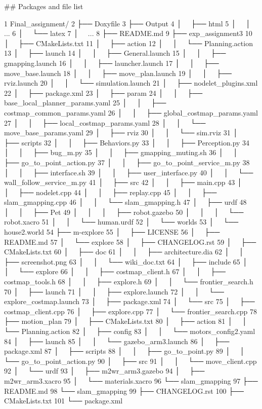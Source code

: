 \#\# Packages and file list 
\begin{DoxyCode}
1 Final\_assignment/
2 ├── Doxyfile
3 ├── Output
4 │   ├── html
5 │   │   ...
6 │   └── latex
7 │       ...
8 ├── README.md
9 ├── exp\_assignment3
10 │   ├── CMakeLists.txt
11 │   ├── action
12 │   │   └── Planning.action
13 │   ├── launch
14 │   │   ├── General.launch
15 │   │   ├── gmapping.launch
16 │   │   ├── launcher.launch
17 │   │   ├── move\_base.launch
18 │   │   ├── move\_plan.launch
19 │   │   ├── rviz.launch
20 │   │   └── simulation.launch
21 │   ├── nodelet\_plugins.xml
22 │   ├── package.xml
23 │   ├── param
24 │   │   ├── base\_local\_planner\_params.yaml
25 │   │   ├── costmap\_common\_params.yaml
26 │   │   ├── global\_costmap\_params.yaml
27 │   │   ├── local\_costmap\_params.yaml
28 │   │   └── move\_base\_params.yaml
29 │   ├── rviz
30 │   │   └── sim.rviz
31 │   ├── scripts
32 │   │   ├── Behaviors.py
33 │   │   ├── Perception.py
34 │   │   ├── bug\_m.py
35 │   │   ├── gmapping\_muting.sh
36 │   │   ├── go\_to\_point\_action.py
37 │   │   ├── go\_to\_point\_service\_m.py
38 │   │   ├── interface.sh
39 │   │   ├── user\_interface.py
40 │   │   └── wall\_follow\_service\_m.py
41 │   ├── src
42 │   │   ├── main.cpp
43 │   │   ├── nodelet.cpp
44 │   │   ├── replay.cpp
45 │   │   ├── slam\_gmapping.cpp
46 │   │   └── slam\_gmapping.h
47 │   ├── urdf
48 │   │   ├── Pet
49 │   │   │   ├── robot.gazebo
50 │   │   │   └── robot.xacro
51 │   │   └── human.urdf
52 │   └── worlds
53 │       └── house2.world
54 ├── m-explore
55 │   ├── LICENSE
56 │   ├── README.md
57 │   └── explore
58 │       ├── CHANGELOG.rst
59 │       ├── CMakeLists.txt
60 │       ├── doc
61 │       │   ├── architecture.dia
62 │       │   ├── screenshot.png
63 │       │   └── wiki\_doc.txt
64 │       ├── include
65 │       │   └── explore
66 │       │       ├── costmap\_client.h
67 │       │       ├── costmap\_tools.h
68 │       │       ├── explore.h
69 │       │       └── frontier\_search.h
70 │       ├── launch
71 │       │   ├── explore.launch
72 │       │   └── explore\_costmap.launch
73 │       ├── package.xml
74 │       └── src
75 │           ├── costmap\_client.cpp
76 │           ├── explore.cpp
77 │           └── frontier\_search.cpp
78 ├── motion\_plan
79 │   ├── CMakeLists.txt
80 │   ├── action
81 │   │   └── Planning.action
82 │   ├── config
83 │   │   └── motors\_config2.yaml
84 │   ├── launch
85 │   │   └── gazebo\_arm3.launch
86 │   ├── package.xml
87 │   ├── scripts
88 │   │   ├── go\_to\_point.py
89 │   │   └── go\_to\_point\_action.py
90 │   ├── src
91 │   │   └── move\_client.cpp
92 │   └── urdf
93 │       ├── m2wr\_arm3.gazebo
94 │       ├── m2wr\_arm3.xacro
95 │       └── materials.xacro
96 └── slam\_gmapping
97     ├── README.md
98     └── slam\_gmapping
99         ├── CHANGELOG.rst
100         ├── CMakeLists.txt
101         └── package.xml
\end{DoxyCode}


